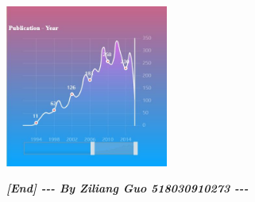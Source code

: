 \documentclass[10pt,twoside,a4paper,titlepage]{article}
\begin{document}
		\includegraphics[width=0.4\textwidth]{gjl/3.jpg}\newline\par

		\textbf{\emph{[End] -{}-{}- By Ziliang Guo 518030910273 -{}-{}-}}

		


\newpage


\end{document}

